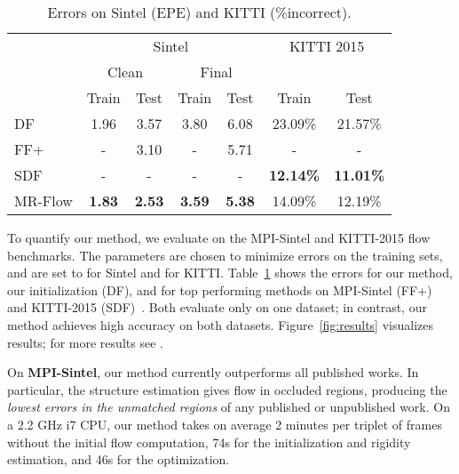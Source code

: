 \documentclass[10pt,twocolumn,letterpaper]{article}
\begin{document}
\begin{table}
\begin{center}
\setlength{\tabcolsep}{3pt}
\begin{tabular}{lcccccc}
\toprule 
     & \multicolumn{4}{c}{Sintel} & \multicolumn{2}{c}{KITTI 2015} \\
     \cmidrule(lr){2-5} \cmidrule(lr){6-7}
     & \multicolumn{2}{c}{Clean} & \multicolumn{2}{c}{Final} & \\
     \cmidrule(lr){2-3} \cmidrule(lr){4-5}
     & Train & Test  & Train & Test & Train & Test \\
    \cmidrule(lr){2-3} \cmidrule(lr){4-5} \cmidrule(lr){6-7}
     DF~\cite{Menze2015GCPR} & 1.96 & 3.57 & 3.80 & 6.08 & 23.09\% & 21.57\%  \\
     FF+~\cite{Bailer:2015:FlowFields} & - & 3.10 & - & 5.71 & - & - \\
     SDF~\cite{Bai:2016:SemanticDeepFlow} & - & - & - & - &  {\bf 12.14\%} & {\bf 11.01\%} \\
     MR-Flow & {\bf 1.83} & {\bf 2.53} & {\bf 3.59} & {\bf 5.38} & 14.09\% & 12.19\% \\
    \bottomrule
\end{tabular}
\caption{Errors on Sintel (EPE) and KITTI (\%incorrect).}
\label{tab:errors_sintel}
\end{center}
\vspace{-0.3in}
\end{table}

\noindent
To quantify our method, we evaluate on the MPI-Sintel and KITTI-2015 flow benchmarks.
The parameters are chosen to minimize errors on the training sets, and are set to
 for Sintel and   for KITTI.
Table~\ref{tab:errors_sintel} shows the errors for our method,
our initialization (DF), and for top
performing methods on MPI-Sintel (FF+)~\cite{Bailer:2015:FlowFields} and
KITTI-2015 (SDF)~\cite{Bai:2016:SemanticDeepFlow}. 
Both evaluate only on one dataset; in contrast, our method achieves high accuracy on both datasets.
Figure~\ref{fig:results} visualizes results;
for more results see \cite{MRFlow:Website}.



On \textbf{MPI-Sintel}, our method currently outperforms all published works. 
In particular, the structure estimation gives flow in occluded
regions, producing the {\it lowest errors in the unmatched regions}
of any published or unpublished work.
On a 2.2 GHz i7 CPU, our method takes on average 2 minutes per triplet of frames without the initial flow computation, 74s for the initialization and rigidity estimation, and 46s for the optimization.
\end{document}
